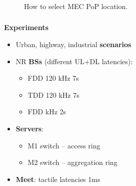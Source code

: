 \documentclass[aspectratio=169]{beamer}
\begin{document}
\begin{frame}
    \frametitle{\secname}
    \framesubtitle{\subsecname}

    \begin{figure}
        \centering
        \caption{How to select MEC PoP location.}
        \label{fig:algo-pop-location}
    \end{figure}
\end{frame}




\begin{frame}
    \frametitle{\secname}
    \framesubtitle{\subsecname}
    \textbf{Experiments}
    \begin{itemize}
        \item Urban, highway, industrial \textbf{scenarios}
        \item NR \textbf{BSs} (different UL+DL latencies):
            \begin{itemize}
                \item FDD 120 kHz 7s
                \item TDD 120 kHz 7s
                \item FDD  kHz 2s
            \end{itemize}
        \item \textbf{Servers}:
            \begin{itemize}
                \item M1 switch -- access ring
                \item M2 switch -- aggregation ring
            \end{itemize}
        \item \textbf{Meet}: tactile latencies 1ms
    \end{itemize}
\end{frame}
\end{document}
